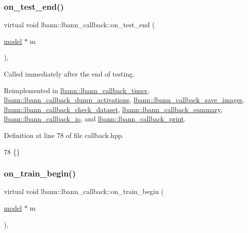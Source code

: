 \subsubsection{\texorpdfstring{on\+\_\+test\+\_\+end()}{on\_test\_end()}}
{\footnotesize\ttfamily virtual void lbann\+::lbann\+\_\+callback\+::on\+\_\+test\+\_\+end (\begin{DoxyParamCaption}\item[{\hyperlink{classlbann_1_1model}{model} $\ast$}]{m }\end{DoxyParamCaption})\hspace{0.3cm}{\ttfamily [inline]}, {\ttfamily [virtual]}}

Called immediately after the end of testing. 

Reimplemented in \hyperlink{classlbann_1_1lbann__callback__timer_ab7db32c743128f8bcfc35c8ea56c226a}{lbann\+::lbann\+\_\+callback\+\_\+timer}, \hyperlink{classlbann_1_1lbann__callback__dump__activations_a5c93f4455b743e3f61600bf092a6d93c}{lbann\+::lbann\+\_\+callback\+\_\+dump\+\_\+activations}, \hyperlink{classlbann_1_1lbann__callback__save__images_a44d0f0113133d6fd8944d8b7702ea786}{lbann\+::lbann\+\_\+callback\+\_\+save\+\_\+images}, \hyperlink{classlbann_1_1lbann__callback__check__dataset_afe1fda5a6bfe632dc680230cc56dff3e}{lbann\+::lbann\+\_\+callback\+\_\+check\+\_\+dataset}, \hyperlink{classlbann_1_1lbann__callback__summary_a8dced0a202df3daaece138a7b958e544}{lbann\+::lbann\+\_\+callback\+\_\+summary}, \hyperlink{classlbann_1_1lbann__callback__io_a8abca84e4b0dc21b28e5d5e409446fdc}{lbann\+::lbann\+\_\+callback\+\_\+io}, and \hyperlink{classlbann_1_1lbann__callback__print_a1f72a486004af859823f75c311dcff42}{lbann\+::lbann\+\_\+callback\+\_\+print}.



Definition at line 78 of file callback.\+hpp.


\begin{DoxyCode}
78 \{\}
\end{DoxyCode}
\mbox{\label{classlbann_1_1lbann__callback_a7c8f0d211967ccc5219144e92571ab26}} 
\subsubsection{\texorpdfstring{on\+\_\+train\+\_\+begin()}{on\_train\_begin()}}
{\footnotesize\ttfamily virtual void lbann\+::lbann\+\_\+callback\+::on\+\_\+train\+\_\+begin (\begin{DoxyParamCaption}\item[{\hyperlink{classlbann_1_1model}{model} $\ast$}]{m }\end{DoxyParamCaption})\hspace{0.3cm}{\ttfamily [inline]}, {\ttfamily [virtual]}}

